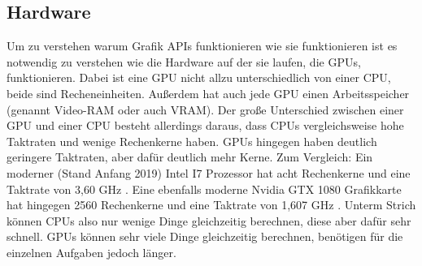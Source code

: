 \subsection{Hardware}
Um zu verstehen warum Grafik APIs funktionieren wie sie funktionieren ist es notwendig zu verstehen wie die Hardware auf der sie laufen, die GPUs, funktionieren. Dabei ist eine GPU nicht allzu unterschiedlich von einer CPU, beide sind Recheneinheiten. Außerdem hat auch jede GPU einen Arbeitsspeicher (genannt Video-RAM oder auch VRAM). Der große Unterschied zwischen einer GPU und einer CPU besteht allerdings daraus, dass CPUs vergleichsweise hohe Taktraten und wenige Rechenkerne haben. GPUs hingegen haben deutlich geringere Taktraten, aber dafür deutlich mehr Kerne. Zum Vergleich: Ein moderner (Stand Anfang 2019) Intel I7 Prozessor hat acht Rechenkerne und eine Taktrate von 3,60 GHz \cite{intel_i7_9700k_processor}. Eine ebenfalls moderne Nvidia GTX 1080 Grafikkarte hat hingegen 2560 Rechenkerne und eine Taktrate von 1,607 GHz \cite{nvidia_gtx_1080_gpu}. Unterm Strich können CPUs also nur wenige Dinge gleichzeitig berechnen, diese aber dafür sehr schnell. GPUs können sehr viele Dinge gleichzeitig berechnen, benötigen für die einzelnen Aufgaben jedoch länger.